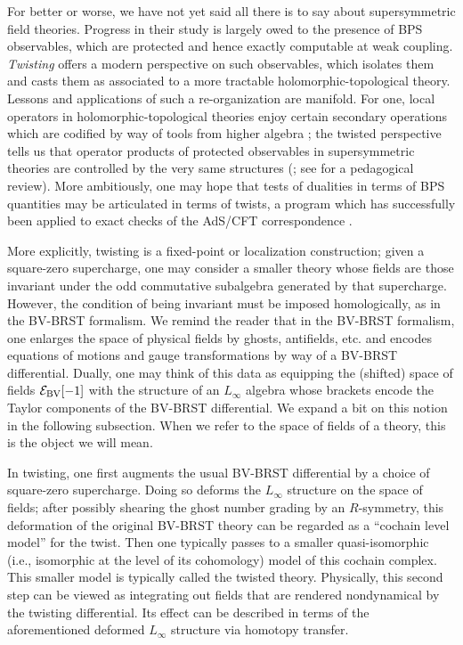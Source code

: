 \documentclass[pdftex]{sigma}
\numberwithin{equation}{section}
\theoremstyle{definition}
\begin{document}
For better or worse, we have not yet said all there is to say about supersymmetric field theories. Progress in their study is largely owed to the presence of BPS observables, which are protected and hence exactly computable at weak coupling. \textit{Twisting} offers a modern perspective on such observables, which isolates them and casts them as associated to a more tractable holomorphic-topological theory. Lessons and applications of such a re-organization are manifold. For one, local operators in holomorphic-topological theories enjoy certain secondary operations which are codified by way of tools from higher algebra \cite{CG1, CG2, williamswang}; the twisted perspective tells us that operator products of protected observables in supersymmetric theories are controlled by the very same structures (\cite{SecondaryOps,Budzik:2022mpd, sucotwist, ElliottSafronov, Gaiotto:2024gii, Garner:2023wrc, garnerhiggscoulomb}; see \cite{Garner:2022its} for a pedagogical review). More ambitiously, one may hope that tests of dualities in terms of BPS quantities may be articulated in terms of twists, a program which has successfully been applied to exact checks of the AdS/CFT correspondence \cite{CostelloMtheory1, CostelloMtheory2,Costello:2018zrm, Costello:2020jbh}.

More explicitly, twisting is a fixed-point or localization construction; given a square-zero supercharge, one may consider a smaller theory whose fields are those invariant under the odd commutative subalgebra generated by that supercharge. However, the condition of being invariant must be imposed homologically, as in the BV-BRST formalism. We remind the reader that in the BV-BRST formalism, one enlarges the space of physical fields by ghosts, antifields, etc. and encodes equations of motions and gauge transformations by way of a BV-BRST differential. Dually, one may think of this data as equipping the (shifted) space of fields $\mathcal{E}_{\rm BV}[-1]$ with the structure of an $L_\infty$ algebra whose brackets encode the Taylor components of the BV-BRST differential. We expand a bit on this notion in the following subsection. When we refer to the space of fields of a theory, this is the object we will mean.

In twisting, one first augments the usual BV-BRST differential by a choice of square-zero supercharge. Doing so deforms the $L_\infty$ structure on the space of fields; after possibly shearing the ghost number grading by an $R$-symmetry, this deformation of the original BV-BRST theory can be regarded as a ``cochain level model'' for the twist. Then one typically passes to a smaller quasi-isomorphic (i.e., isomorphic at the level of its cohomology) model of this cochain complex. This smaller model is typically called the twisted theory. Physically, this second step can be viewed as integrating out fields that are rendered nondynamical by the twisting differential. Its effect can be described in terms of the aforementioned deformed $L_\infty$ structure via homotopy transfer.
\end{document}
